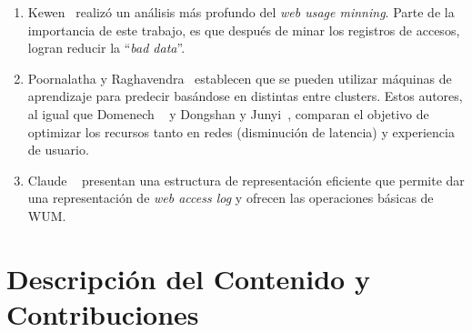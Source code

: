 \begin{enumerate}
  \item Kewen~\cite{kewen2012} realizó un análisis más profundo del \emph{web usage minning}.
  Parte de la importancia de este trabajo, es que después de minar los registros de accesos, logran reducir la ``\emph{bad data}''.

  \item Poornalatha y Raghavendra~\cite{Poornalatha2012} establecen que se pueden utilizar máquinas de aprendizaje para predecir basándose en distintas entre clusters. Estos autores, al igual que Domenech \etal~\cite{Domenech2006} y Dongshan y Junyi~\cite{Dongshan2002}, comparan el objetivo de optimizar los recursos tanto en redes (disminución de latencia) y experiencia de usuario.

  \item Claude \etal~\cite{Claude2014} presentan una estructura de representación eficiente que permite dar una representación de \emph{web access log} y ofrecen las operaciones básicas de WUM.
  
\end{enumerate}







\section{Descripción del Contenido y Contribuciones}


